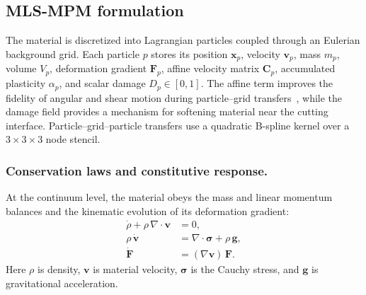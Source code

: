 \subsection{MLS-MPM formulation}
\label{subsec:cut_mpm}

The material is discretized into Lagrangian particles coupled through an Eulerian background grid. Each particle $p$ stores its position $\mathbf{x}_p$, velocity $\mathbf{v}_p$, mass $m_p$, volume $V_p$, deformation gradient $\mathbf{F}_p$, affine velocity matrix $\mathbf{C}_p$, accumulated plasticity $\alpha_p$, and scalar damage $D_p\in[0,1]$. The affine term improves the fidelity of angular and shear motion during particle--grid transfers~\cite{jiang2017angular}, while the damage field provides a mechanism for softening material near the cutting interface. Particle--grid--particle transfers use a quadratic B-spline kernel over a $3\times3\times3$ node stencil.

\subsubsection{Conservation laws and constitutive response.}
At the continuum level, the material obeys the mass and linear momentum balances and the kinematic evolution of its deformation gradient:
\begin{subequations}\label{eq:gov}
\begin{align}
  \dot{\rho}+\rho\,\nabla\!\cdot\!\mathbf{v} &= 0, \label{eq:gov_mass}\\
  \rho\,\dot{\mathbf{v}} &= \nabla\!\cdot\!\boldsymbol{\sigma}+\rho\,\mathbf{g}, \label{eq:gov_mom}\\
  \dot{\mathbf{F}} &= (\nabla\mathbf{v})\,\mathbf{F}. \label{eq:gov_kin}
\end{align}
\end{subequations}
Here $\rho$ is density, $\mathbf{v}$ is material velocity, $\boldsymbol{\sigma}$ is the Cauchy stress, and $\mathbf{g}$ is gravitational acceleration.

